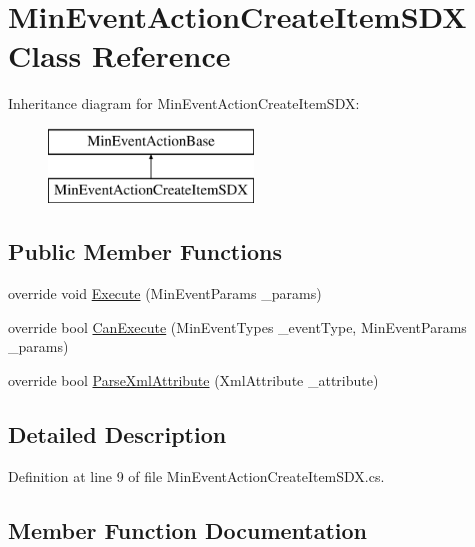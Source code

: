 \hypertarget{class_min_event_action_create_item_s_d_x}{}\section{Min\+Event\+Action\+Create\+Item\+S\+DX Class Reference}
\label{class_min_event_action_create_item_s_d_x}
Inheritance diagram for Min\+Event\+Action\+Create\+Item\+S\+DX\+:\begin{figure}[H]
\begin{center}
\leavevmode
\includegraphics[height=2.000000cm]{class_min_event_action_create_item_s_d_x}
\end{center}
\end{figure}
\subsection*{Public Member Functions}
\begin{DoxyCompactItemize}
\item 
override void \mbox{\hyperlink{class_min_event_action_create_item_s_d_x_a988881e3f8cfc8d0ee0b596449f13c1f}{Execute}} (Min\+Event\+Params \+\_\+params)
\item 
override bool \mbox{\hyperlink{class_min_event_action_create_item_s_d_x_a7f9a7c8f3e39e91314f2e9dcc352089a}{Can\+Execute}} (Min\+Event\+Types \+\_\+event\+Type, Min\+Event\+Params \+\_\+params)
\item 
override bool \mbox{\hyperlink{class_min_event_action_create_item_s_d_x_af877e2c903654e429c2900b709c5af65}{Parse\+Xml\+Attribute}} (Xml\+Attribute \+\_\+attribute)
\end{DoxyCompactItemize}


\subsection{Detailed Description}


Definition at line 9 of file Min\+Event\+Action\+Create\+Item\+S\+D\+X.\+cs.



\subsection{Member Function Documentation}
\mbox{\label{class_min_event_action_create_item_s_d_x_a7f9a7c8f3e39e91314f2e9dcc352089a}} 
